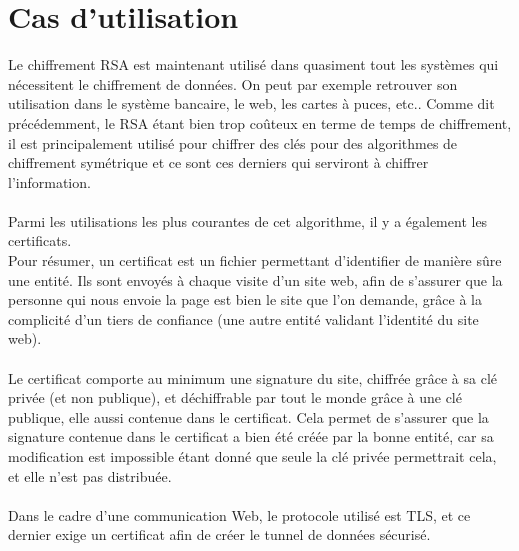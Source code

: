 	\section{Cas d'utilisation}
		Le chiffrement RSA est maintenant utilisé dans quasiment tout les systèmes qui nécessitent le chiffrement de données. On peut par exemple retrouver son utilisation dans le système bancaire, le web, les cartes à puces, etc..
		Comme dit précédemment, le RSA étant bien trop coûteux en terme de temps de chiffrement, il est principalement utilisé pour chiffrer des clés pour des algorithmes de chiffrement symétrique et ce sont ces derniers qui serviront à chiffrer l'information.\\
		\\
		Parmi les utilisations les plus courantes de cet algorithme, il y a également les certificats.\\
		Pour résumer, un certificat est un fichier permettant d'identifier de manière sûre une entité. Ils sont envoyés à chaque visite d'un site web, afin de s'assurer que la personne qui nous envoie la page est bien le site que l'on demande, grâce à la complicité d'un tiers de confiance (une autre entité validant l'identité du site web).\\
		\\
		Le certificat comporte au minimum une signature du site, chiffrée grâce à sa clé privée (et non publique), et déchiffrable par tout le monde grâce à une clé publique, elle aussi contenue dans le certificat. Cela permet de s'assurer que la signature contenue dans le certificat a bien été créée par la bonne entité, car sa modification est impossible étant donné que seule la clé privée permettrait cela, et elle n'est pas distribuée.\\
		\\
		Dans le cadre d'une communication Web, le protocole utilisé est TLS, et ce dernier exige un certificat afin de créer le tunnel de données sécurisé.